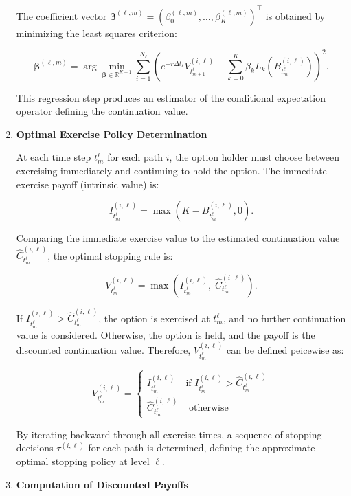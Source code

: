 \documentclass[titlepage]{article}
\begin{document}
\begin{enumerate}
    The coefficient vector \(\boldsymbol{\beta}^{(\ell, m)} = (\beta_0^{(\ell, m)}, \dots, \beta_K^{(\ell, m)})^\top\) is obtained by minimizing the least squares criterion:

    \[
    \boldsymbol{\beta}^{(\ell, m)} = \arg\min_{\boldsymbol{\beta} \in \mathbb{R}^{K+1}} \sum_{i=1}^{N_\ell} \left( e^{-r \Delta t_\ell} V_{t_{m+1}^\ell}^{(i, \ell)} - \sum_{k=0}^K \beta_k L_k \left( B_{t_m^\ell}^{(i, \ell)} \right) \right)^2.
    \]

    This regression step produces an estimator of the conditional expectation operator defining the continuation value.

    \item \textbf{Optimal Exercise Policy Determination}

    At each time step \(t_m^\ell\) for each path \(i\), the option holder must choose between exercising immediately and continuing to hold the option. The immediate exercise payoff (intrinsic value) is:

    \[
    I_{t_m^\ell}^{(i, \ell)} = \max\left( K - B_{t_m^\ell}^{(i, \ell)}, 0 \right).
    \]

    Comparing the immediate exercise value to the estimated continuation value \(\hat{C}_{t_m^\ell}^{(i, \ell)}\), the optimal stopping rule is:

    \[
    V_{t_m^\ell}^{(i, \ell)} = \max\left( I_{t_m^\ell}^{(i, \ell)}, \; \hat{C}_{t_m^\ell}^{(i, \ell)} \right).
    \]

    If \(I_{t_m^\ell}^{(i, \ell)} > \hat{C}_{t_m^\ell}^{(i, \ell)}\), the option is exercised at \(t_m^\ell\), and no further continuation value is considered. Otherwise, the option is held, and the payoff is the discounted continuation value. Therefore, \(V_{t_m^\ell}^{(i,\ell )}\) can be defined peicewise as:

    \[
    V_{t_m^\ell}^{(i,\ell )} = 
        \begin{cases}
        I_{t_m^\ell}^{(i, \ell)} & \text{if } I_{t_m^\ell}^{(i, \ell)} > \hat{C}_{t_m^\ell}^{(i, \ell)} \\
        \hat{C}_{t_m^\ell}^{(i, \ell)} & \text{  otherwise}
        \end{cases}
    \]

    By iterating backward through all exercise times, a sequence of stopping decisions \(\tau^{(i, \ell)}\) for each path is determined, defining the approximate optimal stopping policy at level \(\ell\).

    \item \textbf{Computation of Discounted Payoffs}


\end{enumerate}
\end{document}
